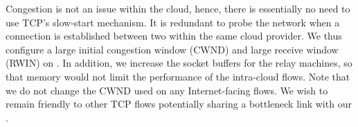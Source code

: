 Congestion is not an issue within the cloud, hence, there is essentially no need to use TCP's slow-start mechanism. It is redundant to probe the network when a connection is established between two \proxies within the same cloud provider. We thus configure a large initial congestion window (CWND) and large receive window (RWIN) on \oursys \proxies. In addition, we increase the socket buffers for the relay machines, so that memory would not limit the performance of the intra-cloud flows.
Note that we do not change the CWND used on any Internet-facing flows. We wish to remain friendly to other TCP flows potentially sharing a bottleneck link with our \proxies. %







